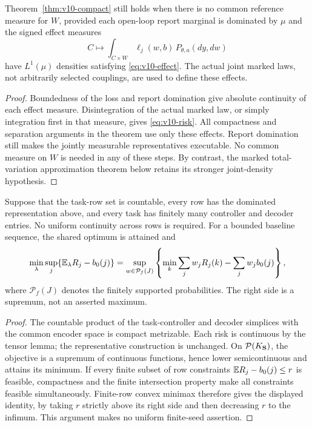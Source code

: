 \begin{corollary}\label{cor:v10-effects}
Theorem~\ref{thm:v10-compact} still holds when there is no common
reference measure for $W$, provided each open-loop report marginal
is dominated by $\mu$ and the signed effect measures
\[
 C\longmapsto\int_{C\times W}\ell_j(w,b)\,P_{\theta,a}(dy,dw)
\]
have $L^1(\mu)$ densities satisfying \eqref{eq:v10-effect}.
The actual joint marked laws, not arbitrarily selected couplings,
are used to define these effects.
\end{corollary}
\begin{proof}
Boundedness of the loss and report domination give absolute
continuity of each effect measure. Disintegration of the actual
marked law, or simply integration first in that measure, gives
\eqref{eq:v10-risk}. All compactness and separation arguments in the
theorem use only these effects. Report domination still makes the
jointly measurable representatives executable. No common measure
on $W$ is needed in any of these steps. By contrast, the marked
total-variation approximation theorem below retains its stronger
joint-density hypothesis.
\end{proof}

\begin{corollary}\label{cor:v10-countable}
Suppose that the task-row set is countable, every row has the dominated
representation above, and every task has finitely many controller and
decoder entries. No uniform continuity across rows is required. For a
bounded baseline sequence, the shared optimum is attained and
\[
 \min_\lambda\sup_j\{\mathbb E_\lambda R_j-b_0(j)\}
 =\sup_{w\in\mathcal P_f(J)}
   \left\{\min_k\sum_jw_jR_j(k)-\sum_jw_jb_0(j)\right\},
\]
where $\mathcal P_f(J)$ denotes the finitely supported probabilities.
The right side is a supremum, not an asserted maximum.
\end{corollary}
\begin{proof}
The countable product of the task-controller and decoder simplices
with the common encoder space is compact metrizable. Each risk is
continuous by the tensor lemma; the representative construction is
unchanged. On $\mathcal P(K_{\bf S})$, the objective is a supremum of
continuous functions, hence lower semicontinuous and attains its
minimum. If every finite subset of row constraints
$\mathbb E R_j-b_0(j)\le r$ is feasible, compactness and the finite intersection
property make all constraints feasible simultaneously. Finite-row
convex minimax therefore gives the displayed identity, by taking
$r$ strictly above its right side and then decreasing $r$ to the
infimum. This argument makes no uniform finite-seed assertion.
\end{proof}


